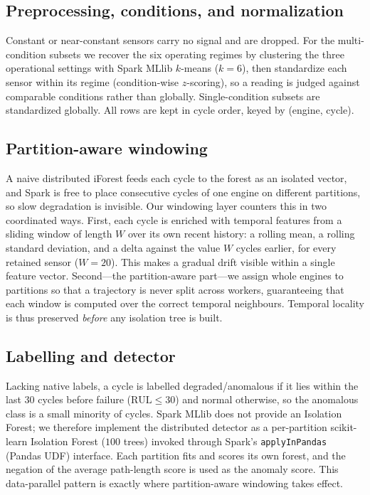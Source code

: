 \documentclass[conference]{IEEEtran}
\begin{document}
\subsection{Preprocessing, conditions, and normalization}
Constant or near-constant sensors carry no signal and are dropped. For the multi-condition subsets we recover the six operating regimes by clustering the three operational settings with Spark MLlib $k$-means ($k{=}6$), then standardize each sensor within its regime (condition-wise $z$-scoring), so a reading is judged against comparable conditions rather than globally. Single-condition subsets are standardized globally. All rows are kept in cycle order, keyed by (engine, cycle).

\subsection{Partition-aware windowing}
A naive distributed iForest feeds each cycle to the forest as an isolated vector, and Spark is free to place consecutive cycles of one engine on different partitions, so slow degradation is invisible. Our windowing layer counters this in two coordinated ways. First, each cycle is enriched with temporal features from a sliding window of length $W$ over its own recent history: a rolling mean, a rolling standard deviation, and a delta against the value $W$ cycles earlier, for every retained sensor ($W{=}20$). This makes a gradual drift visible within a single feature vector. Second---the partition-aware part---we assign whole engines to partitions so that a trajectory is never split across workers, guaranteeing that each window is computed over the correct temporal neighbours. Temporal locality is thus preserved \emph{before} any isolation tree is built.

\subsection{Labelling and detector}
\label{sec:label}
Lacking native labels, a cycle is labelled degraded/anomalous if it lies within the last $30$ cycles before failure ($\text{RUL}\leq 30$) and normal otherwise, so the anomalous class is a small minority of cycles. Spark MLlib does not provide an Isolation Forest; we therefore implement the distributed detector as a per-partition scikit-learn Isolation Forest ($100$ trees) invoked through Spark's \texttt{applyInPandas} (Pandas UDF) interface. Each partition fits and scores its own forest, and the negation of the average path-length score is used as the anomaly score. This data-parallel pattern is exactly where partition-aware windowing takes effect.
\end{document}
